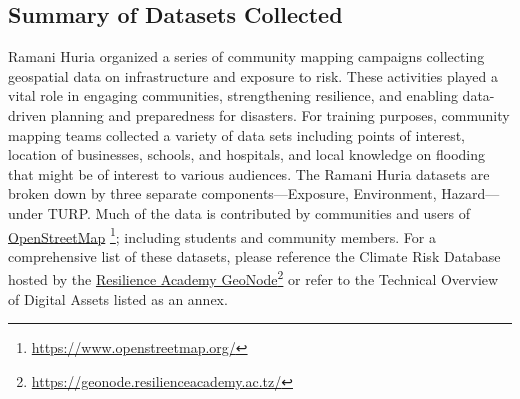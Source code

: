 \documentclass[a4paper,12pt,twoside]{article}
\begin{document}
\subsection{Summary of Datasets Collected}
\begin{multicols}{2}


Ramani Huria organized a series of community mapping campaigns collecting geospatial data on infrastructure and exposure to risk. These activities played a vital role in engaging communities, strengthening resilience, and enabling data-driven planning and preparedness for disasters. 
For training purposes, community mapping teams collected a variety of data sets including points of interest, location of businesses, schools, and hospitals,  and local knowledge on flooding that might be of interest to various audiences.
The Ramani Huria datasets are broken down by three separate components—Exposure, Environment, Hazard—under TURP. Much of the data is contributed by communities and users of \href{https://www.openstreetmap.org/}{OpenStreetMap} \footnote{\url{https://www.openstreetmap.org/}}; including students and community members. For a comprehensive list of these datasets, please reference the Climate Risk Database hosted by the \href{https://geonode.resilienceacademy.ac.tz/}{Resilience Academy GeoNode}\footnote{\url{https://geonode.resilienceacademy.ac.tz/}} or refer to the Technical Overview of Digital Assets listed as an annex.


\end{multicols}
\end{document}
